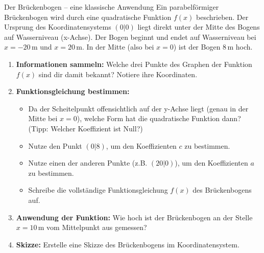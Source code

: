 \begin{aufgabenumgebung}[Brückenbogen]{Der Brückenbogen – eine klassische Anwendung}
Ein parabelförmiger Brückenbogen wird durch eine quadratische Funktion $f(x)$ beschrieben. Der Ursprung des Koordinatensystems $(0|0)$ liegt direkt unter der Mitte des Bogens auf Wasserniveau (x-Achse).
Der Bogen beginnt und endet auf Wasserniveau bei $x=-20\,$m und $x=20\,$m. In der Mitte (also bei $x=0$) ist der Bogen $8\,$m hoch.
\begin{enumerate}
    \item \textbf{Informationen sammeln:} Welche drei Punkte des Graphen der Funktion $f(x)$ sind dir damit bekannt? Notiere ihre Koordinaten.
    \item \textbf{Funktionsgleichung bestimmen:}
        \begin{itemize}
            \item Da der Scheitelpunkt offensichtlich auf der y-Achse liegt (genau in der Mitte bei $x=0$), welche Form hat die quadratische Funktion dann? (Tipp: Welcher Koeffizient ist Null?)
            \item Nutze den Punkt $(0|8)$, um den Koeffizienten $c$ zu bestimmen.
            \item Nutze einen der anderen Punkte (z.B. $(20|0)$), um den Koeffizienten $a$ zu bestimmen.
            \item Schreibe die vollständige Funktionsgleichung $f(x)$ des Brückenbogens auf.
        \end{itemize}
    \item \textbf{Anwendung der Funktion:} Wie hoch ist der Brückenbogen an der Stelle $x=10\,$m vom Mittelpunkt aus gemessen?
    \item \textbf{Skizze:} Erstelle eine Skizze des Brückenbogens im Koordinatensystem.
\end{enumerate}
\end{aufgabenumgebung}


